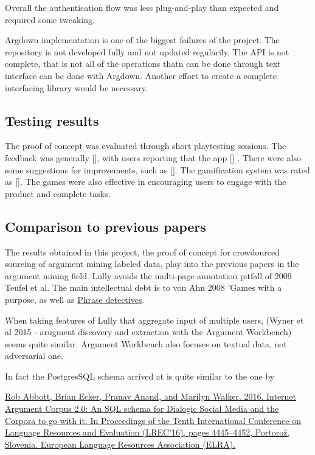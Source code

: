 \documentclass{article}
\begin{document}
Overall the authentication flow was less plug-and-play than expected and required some tweaking. 

Argdown implementation is one of the biggest failures of the project. The repository is not developed fully and not updated regularily. The API is not complete, that is not all of the operations thatn can be done through text interface can be done with Argdown. Another effort to create a complete interfacing library would be necessary.

\subsection{Testing results}
The proof of concept was evaluated through short playtesting sessions. The feedback was generally [], with users reporting that the app [] . There were also some suggestions for improvements, such as [].
The gamification system was rated as [].
The games were also effective in encouraging users to engage with the product and complete tasks.

\subsection{Comparison to previous papers}
The results obtained in this project, the proof of concept for crowdourced sourcing of argument mining labeled data, play into the previous papers in the argument mining field.
Lully avoids the multi-page annotation pitfall of 2009 Teufel et al.
The main intellectual debt is to von Ahn 2008 'Games with a purpose, as well as \href{https://dl.acm.org/doi/10.1145/2448116.2448119}{Phrase detectives}.

When taking features of Lully that aggregate input of multiple users, (Wyner et al 2015 - arugment discovery and extraction with the Argument Workbench) seems quite similar. Argument Workbench also focuses on textual data, not adversarial one. 

In fact the PostgresSQL schema arrived at is quite similar to the one by 

\href{ https://aclanthology.org/L16-1704/ }{ Rob Abbott, Brian Ecker, Pranav Anand, and Marilyn Walker. 2016. Internet Argument Corpus 2.0: An SQL schema for Dialogic Social Media and the Corpora to go with it. In Proceedings of the Tenth International Conference on Language Resources and Evaluation (LREC'16), pages 4445–4452, Portorož, Slovenia. European Language Resources Association (ELRA).  }
\end{document}
